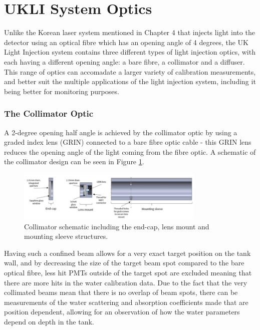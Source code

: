 \section{UKLI System Optics}

Unlike the Korean laser system mentioned in Chapter 4 that injects light into the detector using an optical fibre which has an opening angle of 4 degrees, the UK Light Injection system contains three different types of light injection optics, with each having a different opening angle: a bare fibre, a collimator and a diffuser. This range of optics can accomadate a larger variety of calibration measurements, and better suit the multiple applications of the light injection system, including it being better for monitoring purposes. 

\subsubsection{The Collimator Optic}

A 2-degree opening half angle is achieved by the collimator optic by using a graded index lens (GRIN) connected to a bare fibre optic cable - this GRIN lens reduces the opening angle of the light coming from the fibre optic. A schematic of the collimator design can be seen in Figure \ref{fig:collimator_schematic}. 

\begin{figure}
    \centering
    \includegraphics[width=0.8\textwidth]{Figures/collimator_schematic.png}
    \caption{Collimator schematic including the end-cap, lens mount and mounting sleeve structures.}
    \label{fig:collimator_schematic}
\end{figure}

Having such a confined beam allows for a very exact target position on the tank wall, and by decreasing the size of the target beam spot compared to the bare optical fibre, less hit PMTs outside of the target spot are excluded meaning that there are more hits in the water calibration data. Due to the fact that the very collimated beams mean that there is no overlap of beam spots, there can be measurements of the water scattering and absorption coefficients made that are position dependent, allowing for an observation of how the water parameters depend on depth in the tank. 

